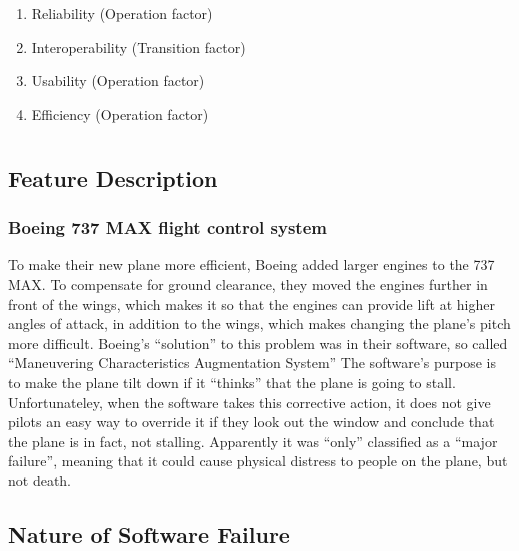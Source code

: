 \documentclass[letterpaper]{article}
\begin{document}
\section{}

\begin{enumerate}
	\item Reliability (Operation factor)
	\item Interoperability (Transition factor)
	\item Usability (Operation factor)
	\item Efficiency (Operation factor)
\end{enumerate}

\section{}

\subsection*{Feature Description}
\subsubsection*{Boeing 737 MAX flight control system}
To make their new plane more efficient, Boeing added larger engines to the 737 MAX.
To compensate for ground clearance, they moved the engines further in front of the wings,
which makes it so that the engines can provide lift at higher angles of attack, in addition to the wings, which makes
changing the plane's pitch more difficult. Boeing's ``solution'' to this problem was in their software,
so called “Maneuvering Characteristics Augmentation System”\cite{ieeespectrum}
The software's purpose is to make the plane tilt down if it ``thinks'' that the plane is going to stall.
Unfortunateley, when the software takes this corrective action, it does not give pilots an easy way to override it if
they look out the window and conclude that the plane is in fact, not stalling.
Apparently it was ``only'' classified as a ``major failure'', meaning that it could cause physical distress to people on the plane, but not death.\cite{gates_2019}

\subsection*{Nature of Software Failure}
\end{document}
